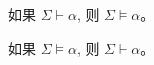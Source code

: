 \begin{frame}{}
  \begin{theorem}
    如果 $\Sigma \vdash \alpha$, 则 $\Sigma \models \alpha$。
  \end{theorem}

  \pause
  \vspace{0.60cm}

  \begin{theorem}
    如果 $\Sigma \models \alpha$, 则 $\Sigma \vdash \alpha$。
  \end{theorem}
\end{frame}

%

%

